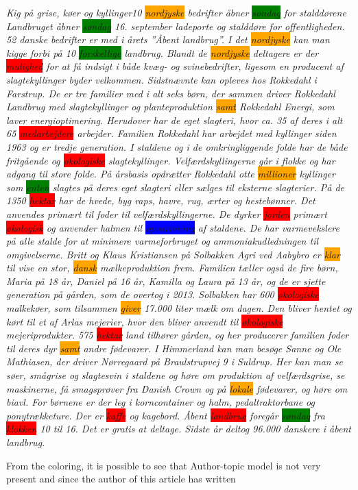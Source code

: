 \emph{
Kig på grise, køer og kyllinger10 \colorbox{orange}{nordjyske} bedrifter åbner \colorbox{green}{søndag} for stalddørene Landbruget åbner \colorbox{green}{søndag} 16. september ladeporte og stalddøre for offentligheden. 52 danske bedrifter er med i årets ”Åbent landbrug”. I det \colorbox{orange}{nordjyske} kan man kigge forbi på 10 \colorbox{green}{forskellige} landbrug. Blandt de \colorbox{orange}{nordjyske} deltagere er der \colorbox{red}{mulighed} for at få indsigt i både kvæg- og svinebedrifter, ligesom en producent af slagtekyllinger byder velkommen. Sidstnævnte kan opleves hos Rokkedahl i Farstrup. De er tre familier med i alt seks børn, der sammen driver Rokkedahl Landbrug med slagtekyllinger og planteproduktion \colorbox{orange}{samt} Rokkedahl Energi, som laver energioptimering. Herudover har de eget slagteri, hvor ca. 35 af deres i alt 65 \colorbox{red}{medarbejdere} arbejder. Familien Rokkedahl har arbejdet med kyllinger siden 1963 og er tredje generation. I staldene og i de omkringliggende folde har de både fritgående og \colorbox{red}{økologiske} slagtekyllinger. Velfærdskyllingerne går i flokke og har adgang til store folde. På årsbasis opdrætter Rokkedahl otte \colorbox{orange}{millioner} kyllinger som \colorbox{green}{enten} slagtes på deres eget slagteri eller sælges til eksterne slagterier. På de 1350 \colorbox{red}{hektar} har de hvede, byg raps, havre, rug, ærter og hestebønner. Det anvendes primært til foder til velfærdskyllingerne. De dyrker \colorbox{red}{jorden} primært \colorbox{red}{økologisk} og anvender halmen til \colorbox{blue}{opvarmning} af staldene. De har varmevekslere på alle stalde for at minimere varmeforbruget og ammoniakudledningen til omgivelserne. Britt og Klaus Kristiansen på Solbakken Agri ved Aabybro er \colorbox{orange}{klar} til vise en stor, \colorbox{orange}{dansk} mælkeproduktion frem. Familien tæller også de fire børn, Maria på 18 år, Daniel på 16 år, Kamilla og Laura på 13 år, og de er sjette generation på gården, som de overtog i 2013. Solbakken har 600 \colorbox{red}{økologiske} malkekøer, som tilsammen \colorbox{orange}{giver} 17.000 liter mælk om dagen. Den bliver hentet og kørt til et af Arlas mejerier, hvor den bliver anvendt til \colorbox{red}{økologiske} mejeriprodukter. 575 \colorbox{red}{hektar} land tilhører gården, og her producerer familien foder til deres dyr \colorbox{orange}{samt} andre fødevarer.  I Himmerland kan man besøge Sanne og Ole Mathiasen, der driver Nørregaard på Braulstrupvej 9 i Suldrup. Her kan man se søer, smågrise og slagtesvin i staldene og høre om produktion af velfærdsgrise, se maskinerne, få smagsprøver fra Danish Crown og på \colorbox{orange}{lokale} fødevarer, og høre om biavl. For børnene er der leg i korncontainer og halm, pedaltraktorbane og ponytrækketure. Der er \colorbox{red}{kaffe} og kagebord. Åbent \colorbox{red}{landbrug} foregår \colorbox{green}{søndag} fra \colorbox{red}{klokken} 10 til 16. Det er gratis at deltage. Sidste år deltog 96.000 danskere i åbent landbrug.
}

From the coloring, it is possible to see that Author-topic model is not very present and since the author of this article has written 

